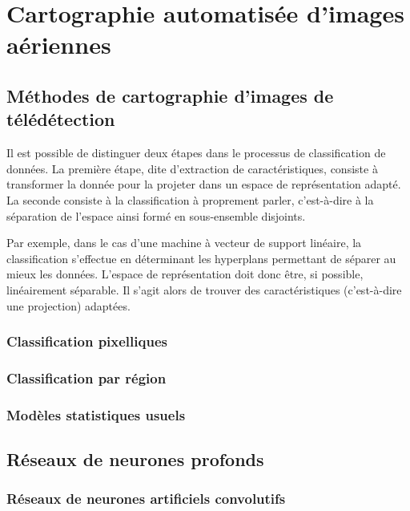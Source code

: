 \chapter{Cartographie automatisée d'images aériennes}
	\citationChap{}{}
	\minitoc
	\newpage


\section{Méthodes de cartographie d'images de télédétection}

Il est possible de distinguer deux étapes dans le processus de classification de données. La première étape, dite d'extraction de caractéristiques, consiste à transformer la donnée pour la projeter dans un espace de représentation adapté. La seconde consiste à la classification à proprement parler, c'est-à-dire à la séparation de l'espace ainsi formé en sous-ensemble disjoints.

Par exemple, dans le cas d'une machine à vecteur de support linéaire, la classification s'effectue en déterminant les hyperplans permettant de séparer au mieux les données. L'espace de représentation doit donc être, si possible, linéairement séparable. Il s'agit alors de trouver des caractéristiques (c'est-à-dire une projection) adaptées.

\subsection{Classification pixelliques}

\subsection{Classification par région}

\subsection{Modèles statistiques usuels}

\section{Réseaux de neurones profonds}

\subsection{Réseaux de neurones artificiels convolutifs}

